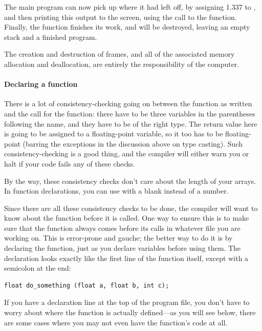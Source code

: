 The main program can now pick up where it had left off, by assigning
1.337 to , and then printing this output to the screen, using
the call to the  function.  Finally, the  function 
finishes its work, and will be destroyed, leaving an empty stack and a
finished program.

The creation and destruction of frames, and all of the associated
memory allocation and deallocation, are entirely the responsibility of
the computer.   

\paragraph{Declaring a function} 
There is a lot of consistency-checking going on between the function as
written and the call for the function: there have to be three variables
in the parentheses following the name, and they have to be of the right
type. The return value here is going to be assigned to a floating-point
variable, so it too has to be floating-point (barring the exceptions in
the discussion above on type casting).
Such consistency-checking is a good thing, and
the compiler will either warn you or halt if your code fails any of these checks.

By the way, these consistency checks don't care about the length of
your arrays. In function declarations, you can use 
with a blank instead of a number.  

Since there are all these consistency
checks to be done, the compiler will want to know about the function
before it is called. One way to ensure this is to make sure that
the function always comes before its calls in whatever file you are
working on. This is error-prone and gauche; the better way to do it is
by declaring the function, just as you declare variables before using
them. The declaration looks exactly like the first line of the function
itself, except with a semicolon at the end:

\begin{lstlisting}
float do_something (float a, float b, int c);
\end{lstlisting}

If you have a declaration line at the top of the program file, you don't
have to worry about where the function is actually defined---as
you will see below, there are some cases where you may not even have the
function's code at all. 

